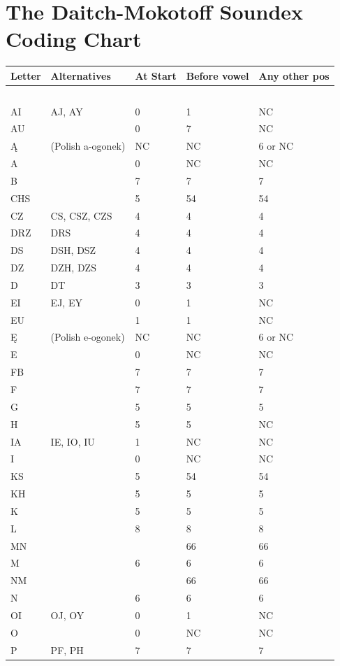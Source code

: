 \documentclass[12pt,a4paper]{article}
\begin{document}
	\section{The Daitch-Mokotoff Soundex Coding Chart}
	\begin{longtable}{|l|l|l|l|l|}
		\hline
		Letter & Alternatives & At Start & Before vowel & Any other pos \\
		\hline
		~&~&~&~&~\\
		AI & AJ, AY & 0 & 1 & NC \\
		AU &   & 0 & 7 & NC \\
		Ą & (Polish a-ogonek) & NC & NC & 6 or NC \\
		A &   & 0 & NC & NC \\
		B &   & 7 & 7 & 7 \\
		CHS &   & 5 & 54 & 54 \\
		CZ & CS, CSZ, CZS & 4 & 4 & 4 \\
		DRZ & DRS & 4 & 4 & 4 \\
		DS & DSH, DSZ & 4 & 4 & 4 \\
		DZ & DZH, DZS & 4 & 4 & 4 \\
		D & DT & 3 & 3 & 3 \\
		EI & EJ, EY & 0 & 1 & NC \\
		EU &   & 1 & 1 & NC \\
		Ę & (Polish e-ogonek) & NC & NC & 6 or NC \\
		E &   & 0 & NC & NC \\
		FB &   & 7 & 7 & 7 \\
		F &   & 7 & 7 & 7 \\
		G &   & 5 & 5 & 5 \\
		H &   & 5 & 5 & NC \\
		IA & IE, IO, IU & 1 & NC & NC \\
		I &   & 0 & NC & NC \\
		KS &   & 5 & 54 & 54 \\
		KH &   & 5 & 5 & 5 \\
		K &   & 5 & 5 & 5 \\
		L &   & 8 & 8 & 8 \\
		MN &   &   & 66 & 66 \\
		M &   & 6 & 6 & 6 \\
		NM &   &   & 66 & 66 \\
		N &   & 6 & 6 & 6 \\
		OI & OJ, OY & 0 & 1 & NC \\
		O &   & 0 & NC & NC \\
		P & PF, PH & 7 & 7 & 7 \\

\end{longtable}
\end{document}
